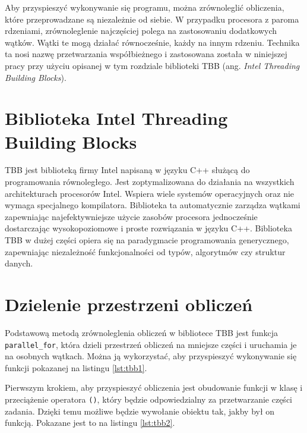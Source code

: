 \documentclass[12pt, twoside, openany]{report}
\begin{document}
Aby przyspieszyć wykonywanie się programu, można zrównoleglić obliczenia, które przeprowadzane są niezależnie od siebie. W przypadku procesora z paroma rdzeniami, zrównoleglenie najczęściej polega na zastosowaniu dodatkowych wątków. Wątki te mogą działać równocześnie, każdy na innym rdzeniu. Technika ta nosi nazwę przetwarzania współbieżnego i zastosowana została w niniejszej pracy przy użyciu opisanej w tym rozdziale biblioteki TBB (ang. \textit{Intel Threading Building Blocks}).

\section {Biblioteka Intel Threading Building Blocks}
\label{tbb}

TBB jest biblioteką firmy Intel napisaną w języku C++ służącą do programowania równoległego. Jest zoptymalizowana do działania na wszystkich architekturach procesorów Intel. Wspiera wiele systemów operacyjnych oraz nie wymaga specjalnego kompilatora. Biblioteka ta automatycznie zarządza wątkami zapewniając najefektywniejsze użycie zasobów procesora jednocześnie dostarczając wysokopoziomowe i proste rozwiązania w języku C++.
Biblioteka TBB w dużej części opiera się na paradygmacie programowania generycznego, zapewniając niezależność funkcjonalności od typów, algorytmów czy struktur danych.

\section{Dzielenie przestrzeni obliczeń}
\label{dzielenie_przestrzeni_obliczen}

Podstawową metodą zrównoleglenia obliczeń w bibliotece TBB jest funkcja \\\texttt{parallel\_for}, która dzieli przestrzeń obliczeń na mniejsze części i uruchamia je na osobnych wątkach. Można ją wykorzystać, aby przyspieszyć wykonywanie się funkcji pokazanej na listingu \ref{lst:tbb1}.



Pierwszym krokiem, aby przyspieszyć obliczenia jest obudowanie funkcji w klasę i przeciążenie operatora \texttt{()}, który będzie odpowiedzialny za przetwarzanie części zadania. Dzięki temu możliwe będzie wywołanie obiektu tak, jakby był on funkcją. Pokazane jest to na listingu \ref{lst:tbb2}.


\end{document}
